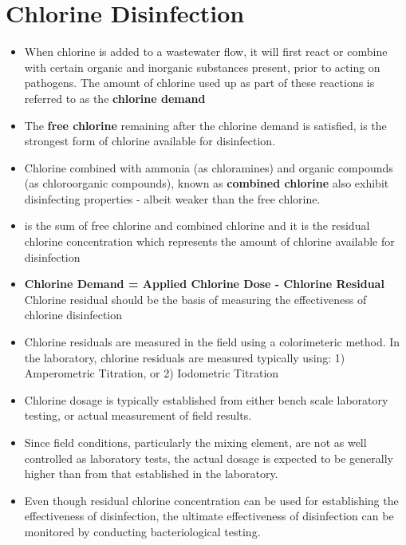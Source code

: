 \section{Chlorine Disinfection}

\begin{itemize}
\item When chlorine is added to a wastewater flow, it will first react or combine with certain organic and inorganic substances present, prior to acting on pathogens.  The amount of chlorine used up as part of these reactions is referred to as the \textbf{chlorine demand}\\

\item The \textbf{free chlorine} remaining after the chlorine demand is satisfied, is the strongest form of chlorine available for disinfection.  

\item Chlorine combined with ammonia (as chloramines) and organic compounds (as chloroorganic compounds), known as \textbf{combined chlorine} also exhibit disinfecting properties - albeit weaker than the free chlorine.

\item {} is the sum of free chlorine and combined chlorine and it is the residual chlorine concentration which represents the amount of chlorine available for disinfection 

\item \textbf{Chlorine Demand = Applied Chlorine Dose - Chlorine Residual}\\ Chlorine residual should be the basis of measuring the effectiveness of chlorine disinfection

\item Chlorine residuals are measured in the field using a colorimeteric method.  In the laboratory, chlorine residuals are measured typically using: 1) Amperometric Titration, or 2) Iodometric Titration

\item Chlorine dosage is typically established from either bench scale laboratory testing, or actual measurement of field results. 

\item Since field conditions, particularly the mixing element, are not as well controlled as laboratory tests, the actual dosage is expected to be generally higher than from that established in the laboratory. 

\item Even though residual chlorine concentration can be used for establishing the effectiveness of disinfection, the ultimate effectiveness of disinfection can be monitored by conducting bacteriological testing.

\end{itemize}

